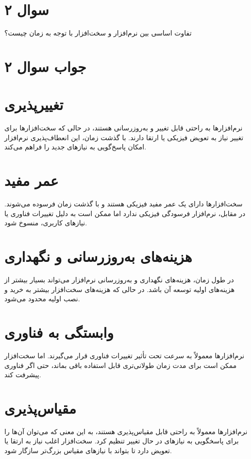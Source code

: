 \section*{سوال ۲}

تفاوت اساسی بین نرم‌افزار و سخت‌افزار با توجه به زمان چیست؟

\section*{جواب سوال ۲}


\section{تغییرپذیری}
نرم‌افزارها به راحتی قابل تغییر و به‌روزرسانی هستند، در حالی که سخت‌افزارها برای تغییر نیاز به تعویض فیزیکی یا ارتقا دارند. با گذشت زمان، این انعطاف‌پذیری نرم‌افزار امکان پاسخ‌گویی به نیازهای جدید را فراهم می‌کند.

\section{عمر مفید}
سخت‌افزارها دارای یک عمر مفید فیزیکی هستند و با گذشت زمان فرسوده می‌شوند. در مقابل، نرم‌افزار فرسودگی فیزیکی ندارد اما ممکن است به دلیل تغییرات فناوری یا نیازهای کاربری، منسوخ شود.

\section{هزینه‌های به‌روزرسانی و نگهداری}
در طول زمان، هزینه‌های نگهداری و به‌روزرسانی نرم‌افزار می‌تواند بسیار بیشتر از هزینه‌های اولیه توسعه آن باشد. در حالی که هزینه‌های سخت‌افزار بیشتر به خرید و نصب اولیه محدود می‌شود.

\section{وابستگی به فناوری}
نرم‌افزارها معمولاً به سرعت تحت تأثیر تغییرات فناوری قرار می‌گیرند. اما سخت‌افزار ممکن است برای مدت زمان طولانی‌تری قابل استفاده باقی بماند، حتی اگر فناوری پیشرفت کند.

\section{مقیاس‌پذیری}
نرم‌افزارها معمولاً به راحتی قابل مقیاس‌پذیری هستند، به این معنی که می‌توان آن‌ها را برای پاسخگویی به نیازهای در حال تغییر تنظیم کرد. سخت‌افزار اغلب نیاز به ارتقا یا تعویض دارد تا بتواند با نیازهای مقیاس بزرگ‌تر سازگار شود.